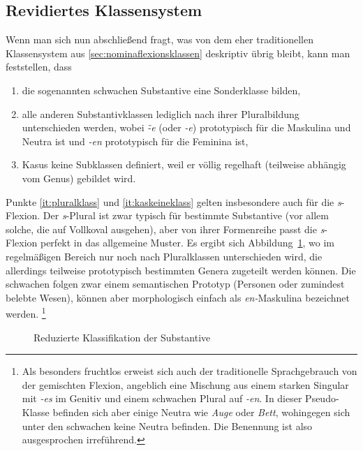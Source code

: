\subsection{Revidiertes Klassensystem}

\label{sec:neuenklassen}


Wenn man sich nun abschließend fragt, was von dem eher traditionellen Klassensystem aus \ref{sec:nominaflexionsklassen} deskriptiv übrig bleibt, kann man feststellen, dass

\begin{enumerate}\Lf
  \item die sogenannten schwachen Substantive eine Sonderklasse bilden,
  \item\label{it:pluralklass} alle anderen Substantivklassen lediglich nach ihrer Pluralbildung unterschieden werden, wobei \textit{\~-e} (oder \textit{-e}) prototypisch für die Maskulina und Neutra ist und \textit{-en} prototypisch für die Feminina ist,
  \item\label{it:kaskeineklass} Kasus keine Subklassen definiert, weil er völlig regelhaft (teilweise abhängig vom Genus) gebildet wird.
\end{enumerate}

Punkte \ref{it:pluralklass} und \ref{it:kaskeineklass} gelten insbesondere auch für die \textit{s}-Flexion.
Der \textit{s}-Plural ist zwar typisch für bestimmte Substantive (vor allem solche, die auf Vollkoval ausgehen), aber von ihrer Formenreihe passt die \textit{s}-Flexion perfekt in das allgemeine Muster.
Es ergibt sich Abbildung~\ref{fig:neuenklassen}, wo im regelmäßigen Bereich nur noch nach Pluralklassen unterschieden wird, die allerdings teilweise prototypisch bestimmten Genera zugeteilt werden können.
Die schwachen folgen zwar einem semantischen Prototyp (Personen oder zumindest belebte Wesen), können aber morphologisch einfach als \textit{en-}Maskulina bezeichnet werden.%
\footnote{Als besonders fruchtlos erweist sich auch der traditionelle Sprachgebrauch von der gemischten Flexion, angeblich eine Mischung aus einem starken Singular mit \textit{-es} im Genitiv und einem schwachen Plural auf \textit{-en}.
In dieser Pseudo-Klasse befinden sich aber einige Neutra wie \textit{Auge} oder \textit{Bett}, wohingegen sich unter den schwachen keine Neutra befinden.
Die Benennung ist also ausgesprochen irreführend.}

\begin{figure}[h!]
  \centering
  \caption{Reduzierte Klassifikation der Substantive}
  \label{fig:neuenklassen}
\end{figure}

